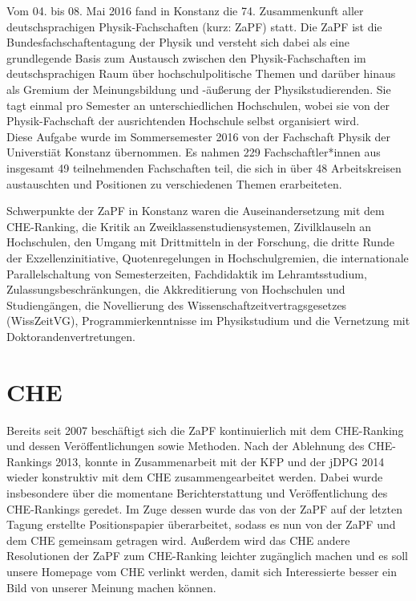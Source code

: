Vom 04. bis 08. Mai 2016 fand in Konstanz die 74. Zusammenkunft
aller deutschsprachigen Physik-Fachschaften (kurz: ZaPF) statt.  Die ZaPF ist
die Bundesfachschaftentagung der Physik und versteht sich dabei als eine
grundlegende Basis zum Austausch zwischen den Physik-Fachschaften im
deutschsprachigen Raum über hochschulpolitische Themen und darüber hinaus als
Gremium der Meinungsbildung und -äußerung der Physikstudierenden. Sie tagt
einmal pro Semester an unterschiedlichen Hochschulen, wobei sie von der
Physik-Fachschaft der ausrichtenden Hochschule selbst organisiert wird. \\

Diese Aufgabe wurde im Sommersemester 2016 von der Fachschaft Physik der Universtiät Konstanz übernommen. Es nahmen 229 Fachschaftler*innen aus
insgesamt 49 teilnehmenden Fachschaften teil, die sich in über  48 Arbeitskreisen austauschten und Positionen zu verschiedenen Themen erarbeiteten.

Schwerpunkte der ZaPF in Konstanz waren die Auseinandersetzung mit dem CHE-Ranking, die Kritik an Zweiklassenstudiensystemen, Zivilklauseln an Hochschulen, den Umgang mit Drittmitteln in der Forschung, die dritte Runde der Exzellenzinitiative, Quotenregelungen in Hochschulgremien, die internationale Parallelschaltung von Semesterzeiten, Fachdidaktik im Lehramtsstudium, Zulassungsbeschränkungen, die Akkreditierung von Hochschulen und Studiengängen, die Novellierung des Wissenschaftzeitvertragsgesetzes (WissZeitVG), Programmierkenntnisse im Physikstudium und die Vernetzung mit Doktorandenvertretungen.

\newpage

\section*{CHE}  
Bereits seit 2007 beschäftigt sich die ZaPF kontinuierlich mit dem CHE-Ranking und dessen
Veröffentlichungen sowie Methoden. Nach der Ablehnung des CHE-Rankings 2013, konnte
in Zusammenarbeit mit der KFP und der jDPG 2014 wieder konstruktiv mit dem CHE
zusammengearbeitet werden. Dabei wurde insbesondere über die momentane Berichterstattung und Veröffentlichung des CHE-Rankings geredet. Im Zuge dessen wurde das von der ZaPF auf der letzten Tagung erstellte Positionspapier überarbeitet, sodass es nun von der ZaPF und dem CHE gemeinsam getragen wird. Außerdem wird das CHE andere Resolutionen der ZaPF zum CHE-Ranking leichter zugänglich machen und es soll unsere Homepage vom CHE verlinkt werden, damit sich Interessierte besser ein Bild von unserer Meinung machen können.

